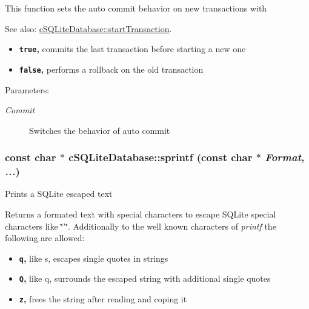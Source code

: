 This function sets the auto commit behavior on new transactions with \begin{Desc}
\item[See also:]\hyperlink{classcSQLiteDatabase_5c481c06d73cff4f1192409bfc23a15a}{cSQLiteDatabase::startTransaction}.\end{Desc}
\begin{itemize}
\item {\bf {\tt true},} commits the last transaction before starting a new one\item {\bf {\tt false},} performs a rollback on the old transaction \end{itemize}
\begin{Desc}
\item[Parameters:]
\begin{description}
\item[{\em Commit}]Switches the behavior of auto commit \end{description}
\end{Desc}
\hypertarget{classcSQLiteDatabase_cdc42326657aea81fd26da6500642381}{
\subsubsection[{sprintf}]{\setlength{\rightskip}{0pt plus 5cm}const char $\ast$ cSQLiteDatabase::sprintf (const char $\ast$ {\em Format}, \/   {\em ...})}}
\label{classcSQLiteDatabase_cdc42326657aea81fd26da6500642381}


Prints a SQLite escaped text

Returns a formated text with special characters to escape SQLite special characters like \char`\"{}'\char`\"{}. Additionally to the well known characters of {\em printf\/} the following are allowed:

\begin{itemize}
\item {\bf {\tt q},} like s, escapes single quotes in strings\item {\bf {\tt Q},} like q, surrounds the escaped string with additional single quotes\item {\bf {\tt z},} frees the string after reading and coping it\end{itemize}


